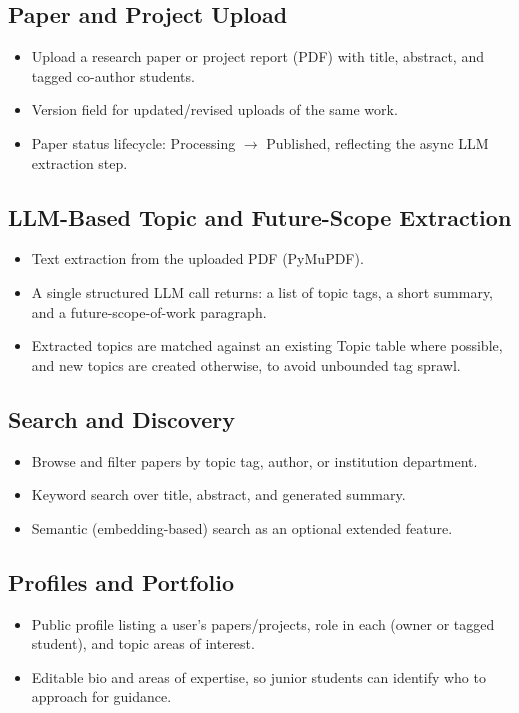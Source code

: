 \documentclass[11pt]{article}
\begin{document}
\subsection{Paper and Project Upload}
\begin{itemize}[itemsep=2pt]
    \item Upload a research paper or project report (PDF) with title, abstract, and tagged co-author students.
    \item Version field for updated/revised uploads of the same work.
    \item Paper status lifecycle: Processing $\rightarrow$ Published, reflecting the async LLM extraction step.
\end{itemize}

\subsection{LLM-Based Topic and Future-Scope Extraction}
\begin{itemize}[itemsep=2pt]
    \item Text extraction from the uploaded PDF (PyMuPDF).
    \item A single structured LLM call returns: a list of topic tags, a short summary, and a future-scope-of-work paragraph.
    \item Extracted topics are matched against an existing Topic table where possible, and new topics are created otherwise, to avoid unbounded tag sprawl.
\end{itemize}

\subsection{Search and Discovery}
\begin{itemize}[itemsep=2pt]
    \item Browse and filter papers by topic tag, author, or institution department.
    \item Keyword search over title, abstract, and generated summary.
    \item Semantic (embedding-based) search as an optional extended feature.
\end{itemize}

\subsection{Profiles and Portfolio}
\begin{itemize}[itemsep=2pt]
    \item Public profile listing a user's papers/projects, role in each (owner or tagged student), and topic areas of interest.
    \item Editable bio and areas of expertise, so junior students can identify who to approach for guidance.
\end{itemize}
\end{document}
